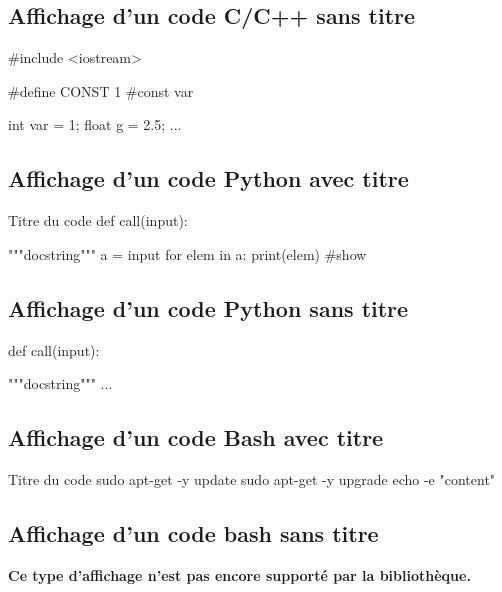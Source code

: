\documentclass[12pt]{report}
\renewcommand{\bold}[1]{\textbf{#1}}
\begin{document}
\subsection{Affichage d'un code C/C++ sans titre}


\begin{Cpp}
#include <iostream>

#define CONST 1 #const var

int var = 1;
float g = 2.5;
...

\end{Cpp}


\subsection{Affichage d'un code Python avec titre}


\begin{Python}{Titre du code}
def call(input):

  """docstring"""
  a = input
  for elem in a:
    print(elem) #show
\end{Python}
\subsection{Affichage d'un code Python sans titre}


\begin{Python}
def call(input):

  """docstring"""
  ...
\end{Python}


\subsection{Affichage d'un code Bash avec titre}


\begin{Bash}{Titre du code}
sudo apt-get -y update
sudo apt-get -y upgrade
echo -e "content"
\end{Bash}
\subsection{Affichage d'un code bash sans titre}

\bold{Ce type d'affichage n'est pas encore supporté par la bibliothèque.}




\end{document}
